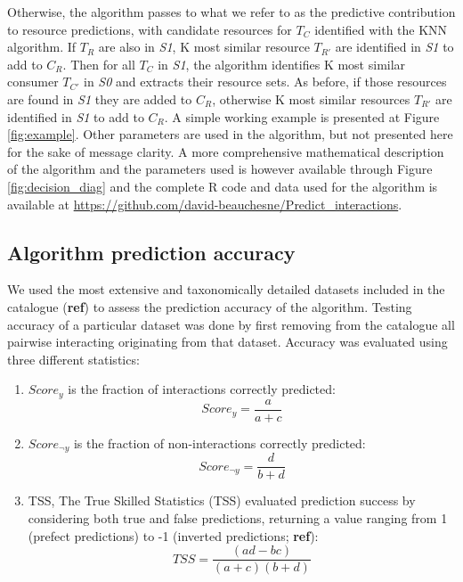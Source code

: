 \documentclass[letterpaper]{article}
\begin{document}
Otherwise, the algorithm passes to what we refer to as the predictive contribution to resource predictions, with candidate resources for $T_C$ identified with the KNN algorithm. If $T_R$ are also in \textit{S1}, K most similar resource $T_{R'}$ are identified in \textit{S1} to add to $C_R$. Then for all $T_C$ in \textit{S1}, the algorithm identifies K most similar consumer $T_{C'}$ in \textit{S0} and extracts their resource sets. As before, if those resources are found in \textit{S1} they are added to $C_R$, otherwise K most similar resources $T_{R'}$ are identified in \textit{S1} to add to $C_R$. A simple working example is presented at Figure \ref{fig:example}. Other parameters are used in the algorithm, but not presented here for the sake of message clarity. A more comprehensive mathematical description of the algorithm and the parameters used is however available through Figure \ref{fig:decision_diag} and the complete R code and data used for the algorithm is available at \href{https://github.com/david-beauchesne/Predict_interactions}{https://github.com/david-beauchesne/Predict\_interactions}.


\subsection{Algorithm prediction accuracy}
We used the most extensive and taxonomically detailed datasets included in the catalogue (\textbf{ref}) to assess the prediction accuracy of the algorithm. Testing accuracy of a particular dataset was done by first removing from the catalogue all pairwise interacting originating from that dataset. Accuracy was evaluated using three different statistics:

\begin{enumerate}
 \item $Score_y$ is the fraction of interactions correctly predicted:
     \begin{equation}
         Score_y = \frac{a}{a + c}
     \end{equation}

 \item $Score_{\neg y}$ is the fraction of non-interactions correctly predicted:
     \begin{equation}
       Score_{\neg y}  = \frac{d}{b + d}
     \end{equation}

 \item TSS, The True Skilled Statistics (TSS) evaluated prediction success by considering both true and false predictions, returning a value ranging from 1 (prefect predictions) to -1 (inverted predictions; \textbf{ref}): %
     \begin{equation}
       TSS = \frac{(ad - bc)}{(a + c)(b + d)}
     \end{equation}
\end{enumerate}
\end{document}
